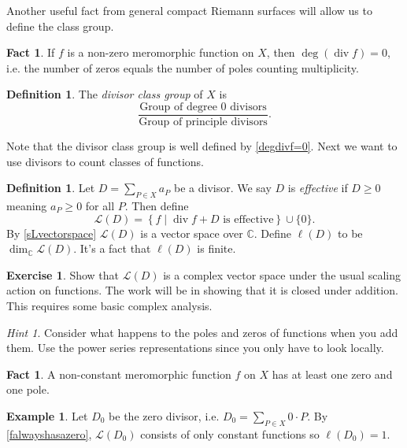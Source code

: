 \documentclass[11pt]{article}
\newcommand{\BB}[1]{\mathbb{#1}} %
\newcommand{\script}[1]{\mathcal{#1}} %
\newcommand{\CC}{\BB{C}}
\newcommand{\sL}{\script{L}}
\newcommand{\st}{\mid}
\renewcommand{\div}{\operatorname{div}} %
\theoremstyle{plain}
\theoremstyle{definition}
\newtheorem{defn}[definitionCounter]{Definition}
\newtheorem{ex}[exampleCounter]{Example}
\newtheorem{excer}[exerciseCounter]{Exercise}
\newtheorem{fact}[factCounter]{Fact}
\theoremstyle{remark}
\newtheorem*{hint}{Hint}
\begin{document}
Another useful fact from general compact Riemann surfaces will allow us to define the class group.

\begin{fact}\label{degdivf=0}
	If $f$ is a non-zero meromorphic function on $X$, then $\deg(\div f) = 0$, i.e. the number of zeros equals the number of poles counting multiplicity.
\end{fact}

\begin{defn}\label{classgp}
	The \emph{divisor class group} of $X$ is
	$$
	\frac{\text{Group of degree $0$ divisors}}{\text{Group of principle divisors}}.
	$$
\end{defn}

Note that the divisor class group is well defined by \autoref{degdivf=0}. Next we want to use divisors to count classes of functions.

\begin{defn}
	Let $D = \sum_{P\in X}a_P$ be a divisor. We say $D$ is \emph{effective} if $D \geq 0$ meaning $a_P\geq 0$ for all $P$. Then define
	$$
	\sL(D) = \left\{ f \st \div f + D \text{ is effective} \right\}\cup\{0\}.
	$$
	By \autoref{sLvectorspace} $\sL(D)$ is a vector space over $\CC$. Define $\ell(D)$ to be $\dim_{\CC}\sL(D)$. It's a fact that $\ell (D)$ is finite.
\end{defn}

\begin{excer}\label{sLvectorspace}
	Show that $\sL(D)$ is a complex vector space under the usual scaling action on functions. The work will be in showing that it is closed under addition. This requires some basic complex analysis.
	\begin{hint}
		Consider what happens to the poles and zeros of functions when you add them. Use the power series representations since you only have to look locally.
	\end{hint}
\end{excer}

\begin{fact}\label{falwayshasazero}
	A non-constant meromorphic function $f$ on $X$ has at least one zero and one pole.
\end{fact}

\begin{ex}\label{key}
	Let $D_0$ be the zero divisor, i.e. $D_0 = \sum_{P\in X}0\cdot P$. By \autoref{falwayshasazero}, $\sL(D_0)$ consists of only constant functions so $\ell(D_0) = 1$.
\end{ex}
\end{document}
